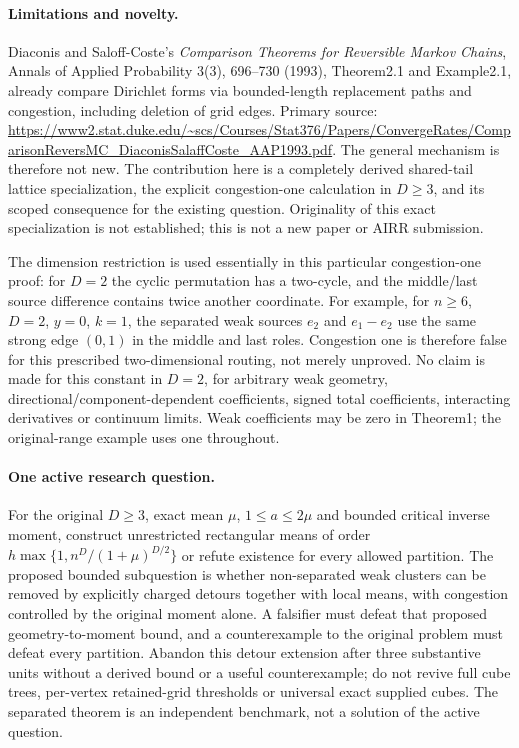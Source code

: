 \documentclass[11pt]{article}
\begin{document}
\paragraph{Limitations and novelty.}
Diaconis and Saloff-Coste's \emph{Comparison Theorems for Reversible Markov Chains}, Annals of Applied Probability 3(3), 696--730 (1993), Theorem2.1 and Example2.1, already compare Dirichlet forms via bounded-length replacement paths and congestion, including deletion of grid edges. Primary source:
\url{https://www2.stat.duke.edu/~scs/Courses/Stat376/Papers/ConvergeRates/ComparisonReversMC_DiaconisSalaffCoste_AAP1993.pdf}.
The general mechanism is therefore not new. The contribution here is a completely derived shared-tail lattice specialization, the explicit congestion-one calculation in $D\ge3$, and its scoped consequence for the existing question. Originality of this exact specialization is not established; this is not a new paper or AIRR submission.

The dimension restriction is used essentially in this particular congestion-one proof: for $D=2$ the cyclic permutation has a two-cycle, and the middle/last source difference contains twice another coordinate. For example, for $n\ge6$, $D=2$, $y=0$, $k=1$, the separated weak sources $e_2$ and $e_1-e_2$ use the same strong edge $(0,1)$ in the middle and last roles. Congestion one is therefore false for this prescribed two-dimensional routing, not merely unproved. No claim is made for this constant in $D=2$, for arbitrary weak geometry, directional/component-dependent coefficients, signed total coefficients, interacting derivatives or continuum limits. Weak coefficients may be zero in Theorem1; the original-range example uses one throughout.

\paragraph{One active research question.}
For the original $D\ge3$, exact mean $\mu$, $1\le a\le2\mu$ and bounded critical inverse moment, construct unrestricted rectangular means of order $h\max\{1,n^D/(1+\mu)^{D/2}\}$ or refute existence for every allowed partition. The proposed bounded subquestion is whether non-separated weak clusters can be removed by explicitly charged detours together with local means, with congestion controlled by the original moment alone. A falsifier must defeat that proposed geometry-to-moment bound, and a counterexample to the original problem must defeat every partition. Abandon this detour extension after three substantive units without a derived bound or a useful counterexample; do not revive full cube trees, per-vertex retained-grid thresholds or universal exact supplied cubes. The separated theorem is an independent benchmark, not a solution of the active question.
\end{document}
